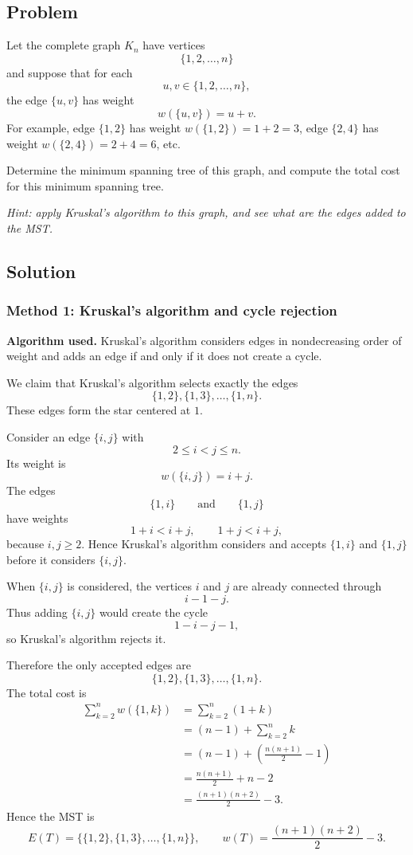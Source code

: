\documentclass[12pt]{article}
\begin{document}
\subsection{Problem}
Let the complete graph $K_n$ have vertices
\[
  \{1,2,\dots,n\}
\]
and suppose that for each
\[
  u,v\in\{1,2,\dots,n\},
\]
the edge $\{u,v\}$ has weight
\[
  w(\{u,v\})=u+v.
\]
For example, edge $\{1,2\}$ has weight $w(\{1,2\})=1+2=3$, edge $\{2,4\}$ has weight $w(\{2,4\})=2+4=6$, etc.

Determine the minimum spanning tree of this graph, and compute the total cost for this minimum spanning tree.

\medskip
\noindent
\textit{Hint: apply Kruskal's algorithm to this graph, and see what are the edges added to the MST.}

\subsection{Solution}

\subsubsection{Method 1: Kruskal's algorithm and cycle rejection}
\textbf{Algorithm used.} Kruskal's algorithm considers edges in nondecreasing order of weight and adds an edge if and only if it does not create a cycle.

We claim that Kruskal's algorithm selects exactly the edges
\[
  \{1,2\},\{1,3\},\dots,\{1,n\}.
\]
These edges form the star centered at $1$.

Consider an edge $\{i,j\}$ with
\[
  2\le i<j\le n.
\]
Its weight is
\[
  w(\{i,j\})=i+j.
\]
The edges
\[
  \{1,i\}
  \qquad\text{and}\qquad
  \{1,j\}
\]
have weights
\[
  1+i<i+j,
  \qquad
  1+j<i+j,
\]
because $i,j\ge 2$. Hence Kruskal's algorithm considers and accepts $\{1,i\}$ and $\{1,j\}$ before it considers $\{i,j\}$.

When $\{i,j\}$ is considered, the vertices $i$ and $j$ are already connected through
\[
  i-1-j.
\]
Thus adding $\{i,j\}$ would create the cycle
\[
  1-i-j-1,
\]
so Kruskal's algorithm rejects it.

Therefore the only accepted edges are
\[
  \{1,2\},\{1,3\},\dots,\{1,n\}.
\]
The total cost is
\[
\begin{aligned}
  \sum_{k=2}^{n} w(\{1,k\})
  &=\sum_{k=2}^{n} (1+k)\\
  &=(n-1)+\sum_{k=2}^{n}k\\
  &=(n-1)+\left(\frac{n(n+1)}{2}-1\right)\\
  &=\frac{n(n+1)}{2}+n-2\\
  &=\frac{(n+1)(n+2)}{2}-3.
\end{aligned}
\]
Hence the MST is
\[
  \boxed{
  E(T)=\{\{1,2\},\{1,3\},\dots,\{1,n\}\},
  \qquad
  w(T)=\frac{(n+1)(n+2)}{2}-3.}
\]
\end{document}

